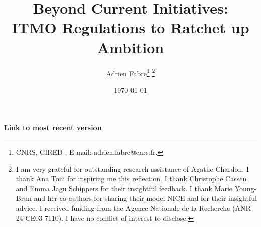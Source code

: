 \documentclass[12pt,english]{article}
\title{Beyond Current Initiatives:\\ ITMO Regulations to Ratchet up Ambition
} %
\author{Adrien Fabre\footnote{CNRS, CIRED%
. E-mail: adrien.fabre@cnrs.fr.} \footnote{I am very grateful for outstanding research assistance of Agathe Chardon. %
I thank Ana Toni for inspiring me this reflection. I thank Christophe Cassen and Emma Jagu Schippers for their insightful feedback. I thank Marie Young-Brun and her co-authors for sharing their model NICE and for their insightful advice. 
I received funding from the Agence Nationale de la Recherche (ANR-24-CE03-7110). I have no conflict of interest to disclose.}}  %
\date{\today} %
\newcommand{\bo}[1]{\textbf{#1}}
\begin{document}
\sloppy
\maketitle

\vspace{-1cm}  %
\begin{center}
{\bo{\href{https://github.com/bixiou/global_tax_attitudes/raw/main/paper/itmo_rules.pdf}{Link to most recent version}}}
\end{center}


\end{document}
